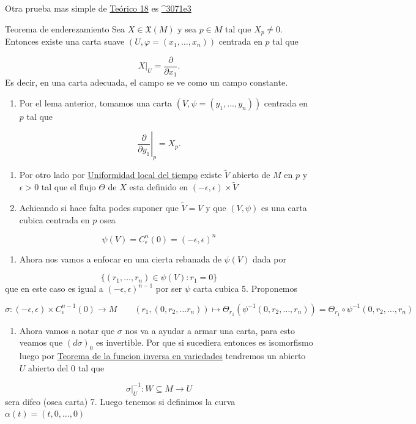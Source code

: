 \label{blk:047506}
\begin{bookremark}{}
Otra prueba mas simple de \hyperref[blk:047506]{Teórico 18} es \hyperref[blk:3071e3]{\textasciicircum{}3071e3}

\end{bookremark}
\begin{booktheorem}{Teorema de enderezamiento}
Sea $X\in\mathfrak X(M)$ y sea $p\in M$ tal que $X_p\neq0$. Entonces existe una carta suave $(U,\varphi=(x_1,\ldots,x_n))$ centrada en $p$ tal que

\[
X|_U=\frac{\partial}{\partial x_1}.
\]
Es decir, en una carta adecuada, el campo se ve como un campo constante.

\end{booktheorem}
\begin{bookproof}{}
\begin{enumerate}
\item Por el lema anterior, tomamos una carta $(V,\psi=(y_1,\ldots,y_n))$ centrada en $p$ tal que
\end{enumerate}
\[
\left.\frac{\partial}{\partial y_1}\right|_p=X_p.
\]
\begin{enumerate}[start=2]
\item Por otro lado por \hyperref[blk:3b18e6]{Uniformidad local del tiempo} existe $\widetilde{V}$ abierto de $M$ en $p$ y $\epsilon>0$ tal que el flujo $\Theta$ de $X$ esta definido en $(-\epsilon,\epsilon)\times \widetilde{V}$
\item Achicando si hace falta podes suponer que $\widetilde{V}=V$ y que $(V,\psi)$ es una carta cubica centrada en $p$ osea
\end{enumerate}
\[
\psi(V)=C_{\epsilon}^{n} (0)=(-\epsilon,\epsilon)^{n}
\]
\begin{enumerate}[start=4]
\item Ahora nos vamos a enfocar en una cierta rebanada de $\psi(V)$ dada por
\end{enumerate}
\[
\{ (r_{1},\ldots,r_{n})\in \psi(V):r_{1}=0 \}
\]
que en este caso es igual a $(-\epsilon,\epsilon)^{n-1}$ por ser $\psi$ carta cubica 5. Proponemos

\[
\sigma:(-\epsilon,\epsilon)\times C_{\epsilon}^{n-1}(0)\rightarrow M\qquad (r_{1},(0,r_{2},\ldots r_{n}))\mapsto \Theta_{r_{1}}(\psi ^{-1}(0,r_{2},\ldots,r_{n}))=\Theta_{r_{1}}\circ\psi ^{-1}(0,r_{2},\ldots,r_{n})
\]
\begin{enumerate}[start=6]
\item Ahora vamos a notar que $\sigma$ nos va a ayudar a armar una carta, para esto veamos que $(d\sigma)_{0}$ es invertible. Por que si sucediera entonces es isomorfismo luego por \hyperref[blk:b664ba]{Teorema de la funcion inversa en variedades} tendremos un abierto $U$ abierto del $0$ tal que
\end{enumerate}
\[
\sigma|_{U}^{-1}:W\subseteq M\rightarrow U
\]
sera difeo (osea carta) 7. Luego tenemos si definimos la curva $\alpha (t)=(t,0,\ldots,0)$


\end{bookproof}
